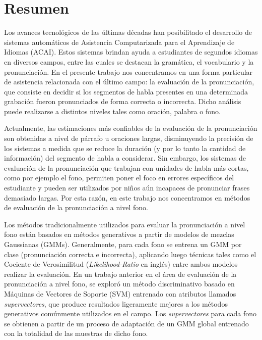 \chapter*{Resumen}

Los avances tecnol\'{o}gicos de las \'{u}ltimas d\'{e}cadas han
posibilitado el desarrollo de sistemas
autom\'{a}ticos de Asistencia Computarizada para el Aprendizaje de Idiomas (ACAI).
Estos sistemas brindan ayuda a estudiantes de segundos idiomas
en diversos campos, entre las cuales se destacan la gram\'{a}tica, el vocabulario
y la pronunciaci\'{o}n. En el presente trabajo nos concentramos en una forma
particular de asistencia relacionada con el \'{u}ltimo campo:
la evaluaci\'{o}n
de la pronunciaci\'{o}n, que consiste en decidir si los segmentos de habla presentes
en una determinada
grabaci\'{o}n fueron pronunciados de forma correcta o incorrecta. Dicho an\'{a}lisis
puede realizarse a distintos niveles tales como oraci\'{o}n, palabra o fono.

Actualmente, las estimaciones m\'{a}s confiables de la evaluaci\'{o}n de la pronunciaci\'{o}n
son obtenidas a nivel de p\'{a}rrafo u oraciones largas, disminuyendo la precisi\'{o}n
de los sistemas a medida que se reduce la duraci\'{o}n
(y por lo tanto la cantidad de informaci\'{o}n) del segmento de habla a considerar.
Sin embargo, los sistemas de evaluaci\'{o}n de la pronunciaci\'{o}n
que trabajan con unidades de habla
m\'{a}s cortas, como por ejemplo el fono,
permiten poner el foco en errores espec\'{i}ficos del estudiante y
pueden ser utilizados por ni\~nos a\'{u}n incapaces de pronunciar frases
demasiado largas. Por esta raz\'{o}n,
en este trabajo nos concentramos en m\'{e}todos de evaluaci\'{o}n de la pronunciaci\'{o}n
a nivel fono.

Los m\'{e}todos tradicionalmente utilizados para evaluar
la pronunciaci\'{o}n a nivel fono
est\'{a}n basados en m\'{e}todos generativos a partir de
modelos de mezclas Gaussianas (GMMs). Generalmente,
para cada fono se
entrena un GMM por clase (pronunciaci\'{o}n correcta e incorrecta),
aplicando luego t\'{e}cnicas tales como el Cociente de
Verosimilitud (\textit{Likelihood-Ratio} en ingl\'{e}s) entre ambos modelos realizar
la evaluaci\'{o}n. En un trabajo anterior en
el \'{a}rea de evaluaci\'{o}n de la pronunciaci\'{o}n a nivel fono,
se explor\'{o}
un m\'{e}todo discriminativo basado en M\'{a}quinas de Vectores de Soporte (SVM) entrenado
con atributos llamados \textit{supervectores}, que produce resultados
ligeramente mejores a los m\'{e}todos generativos com\'{u}nmente utilizados en el campo.
Los \textit{supervectores} para cada fono se obtienen
a partir de un proceso de adaptaci\'{o}n de un
GMM global entrenado con la totalidad
de las muestras de dicho fono.

